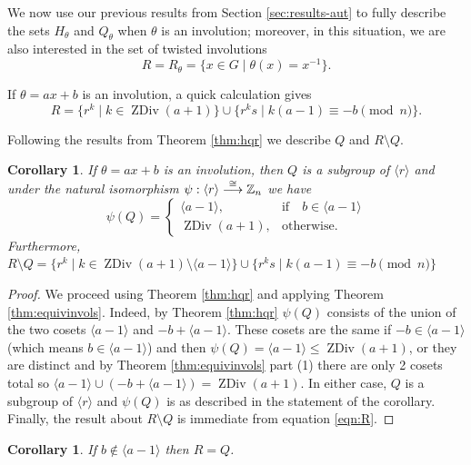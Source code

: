 \documentclass[12pt]{amsart}
\numberwithin{equation}{section}
\newtheorem{cor}[theorem]{Corollary}
\theoremstyle{definition}
\newcommand{\Z}{\mathbb{Z}}
\newcommand{\zdiv}[1]{{\operatorname{ZDiv}(#1)}}
\renewcommand{\Z}{\mathbb{Z}}
\begin{document}
We now use our previous results from Section \ref{sec:results-aut} to
fully describe the sets $H_\theta$ and $Q_\theta$ when $\theta$ is an 
involution; moreover, in this situation, we are also interested in the set of twisted involutions
$$R=R_\theta=\{x\in G\mid \theta(x)=x^{-1}\}.$$


If $\theta=ax+b$ is an involution, a quick calculation gives 
\begin{equation}
\label{eqn:R}
R=\{r^k\mid k\in\zdiv{a+1}\}\cup \{r^ks\mid k(a-1)\equiv -b\pmod{n}\}.
\end{equation}

Following the results from Theorem \ref{thm:hqr} we describe $Q$ and $R\setminus Q$. 
\begin{cor}
\label{cor:Q-is-ZDiv}
If $\theta=ax+b$ is an involution, then $Q$ is a subgroup of $\langle
r \rangle$ and under the natural isomorphism $\psi: \langle r \rangle
\buildrel\cong\over\longrightarrow \Z_n$ we have 
\[ \psi(Q) = \begin{cases}
\langle a-1 \rangle, & \text{if} \quad b \in \langle a-1 \rangle \\
\zdiv{a+1}, & \text{otherwise.}
\end{cases} \]
Furthermore, 
$R \setminus Q = \{r^k\mid k\in\zdiv{a+1}\setminus\langle a-1\rangle\}\cup\{r^ks \mid k(a-1)\equiv -b\pmod{n}\}$
\end{cor}

\begin{proof}
  We proceed using Theorem \ref{thm:hqr} and
  applying Theorem \ref{thm:equivinvols}. Indeed, by Theorem \ref{thm:hqr} $\psi(Q)$ consists of the
  union of the two cosets $\langle a-1 \rangle$ and $-b + \langle a-1
  \rangle$. These cosets are
  the same if $-b \in \langle a-1 \rangle$ (which means $b\in\langle a-1\rangle$) and then $\psi(Q) = \langle a - 1 \rangle \le \zdiv{a+1}$, or they are
  distinct and by Theorem \ref{thm:equivinvols} part (1) there are
  only 2 cosets total so 
  $\langle a - 1 \rangle \cup (-b+\langle a - 1 \rangle) =
  \zdiv{a+1}$. In either case, $Q$ is a subgroup of $\langle r
  \rangle$ and $\psi(Q)$ is as described in the statement of the
  corollary. Finally, the result about $R \setminus Q$ is immediate
  from equation \eqref{eqn:R}.
\end{proof}

\begin{cor}
If $b\not\in\langle a-1\rangle$ then $R=Q$.
\end{cor}
\end{document}
